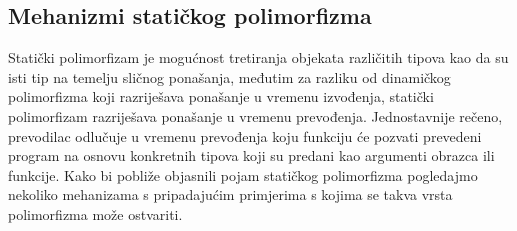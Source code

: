 \subsection{Mehanizmi statičkog polimorfizma}
Statički polimorfizam je mogućnost tretiranja objekata različitih tipova kao da su isti tip na temelju sličnog ponašanja, međutim za razliku od dinamičkog polimorfizma koji razriješava ponašanje u vremenu izvođenja, statički polimorfizam razriješava ponašanje u vremenu prevođenja. Jednostavnije rečeno, prevodilac odlučuje u vremenu prevođenja koju funkciju će pozvati prevedeni program na osnovu konkretnih tipova koji su predani kao argumenti obrazca ili funkcije. Kako bi pobliže objasnili pojam statičkog polimorfizma pogledajmo nekoliko mehanizama s pripadajućim primjerima s kojima se takva vrsta polimorfizma može ostvariti. 

